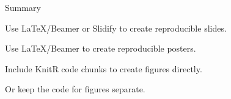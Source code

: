 \documentclass[12pt,t]{beamer}
\begin{document}
\begin{frame}{Summary}

\bbi
\item Use LaTeX/Beamer or Slidify to create reproducible slides.
\item Use LaTeX/Beamer to create reproducible posters.
\item Include KnitR code chunks to create figures directly.
\item Or keep the code for figures separate.
\ei

\end{frame}
\end{document}

